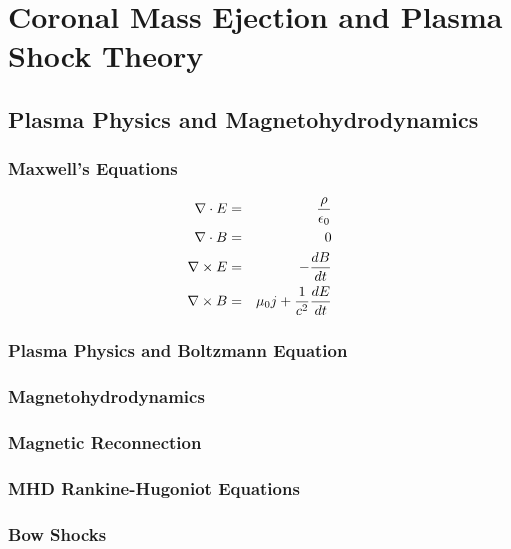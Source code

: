 \chapter{Coronal Mass Ejection and Plasma Shock Theory} 
\label{chap:2}

\section{Plasma Physics and Magnetohydrodynamics}\label{sec:1}

\subsection{Maxwell's Equations}\label{sec:10}

\begin{eqnarray}
\nabla \cdot E &=& \frac{\rho}{\epsilon_0} \\
\nabla \cdot B &=& 0 \\
{\bf \nabla} \times{E} &=& - \frac{dB}{dt} \\
{\bf \nabla} \times{B} &=& \mu_0 j + \frac{1}{c^2}\frac{dE}{dt} 
\end{eqnarray}



\subsection{Plasma Physics and Boltzmann Equation}\label{sec:11}

\subsection{Magnetohydrodynamics}\label{sec:12}

\subsection{Magnetic Reconnection}\label{sec:13}

\subsection{MHD Rankine-Hugoniot Equations}\label{sec:14}

\subsection{Bow Shocks}\label{sec:15}



